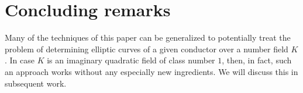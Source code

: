 

\section{Concluding remarks}

Many of the techniques of this paper can be generalized to potentially treat the problem of determining elliptic curves of a given conductor over a number field $K$. 
In case $K$ is an imaginary quadratic field of class number $1$, then, in fact, such an approach works without any especially new ingredients. We will discuss this in subsequent work.





\endinput

Any text after an \endinput is ignored.
You could put scraps here or things in progress.
